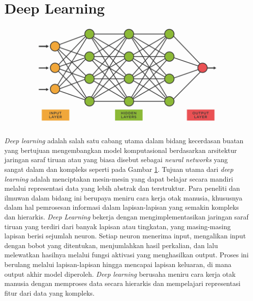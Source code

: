 \section{Deep Learning}
\begin{figure}[hbt!]
  \centering
	\includegraphics[width=0.9\linewidth]{gambar/bener/ArsitekturDeeplearning.png}
	\label{fig:Deep Learning secara umum}
\end{figure}  
\textit{Deep learning} adalah salah satu cabang utama dalam bidang kecerdasan buatan yang bertujuan mengembangkan model komputasional berdasarkan arsitektur jaringan saraf tiruan atau yang biasa disebut sebagai \textit{neural networks} yang sangat dalam dan kompleks seperti pada Gambar \ref{fig:Deep Learning secara umum}. Tujuan utama dari \textit{deep learning} adalah menciptakan mesin-mesin yang dapat belajar secara mandiri melalui representasi data yang lebih abstrak dan terstruktur. Para peneliti dan ilmuwan dalam bidang ini berupaya meniru cara kerja otak manusia, khususnya dalam hal pemrosesan informasi dalam lapisan-lapisan yang semakin kompleks dan hierarkis. \textit{Deep Learning} bekerja dengan mengimplementasikan jaringan saraf tiruan yang terdiri dari banyak lapisan atau tingkatan, yang masing-masing lapisan berisi sejumlah neuron. Setiap neuron menerima input, mengalikan input dengan bobot yang ditentukan, menjumlahkan hasil perkalian, dan lalu melewatkan hasilnya melalui fungsi aktivasi yang menghasilkan output. Proses ini berulang melalui lapisan-lapisan hingga mencapai lapisan keluaran, di mana output akhir model diperoleh. \textit{Deep learning} berusaha meniru cara kerja otak manusia dengan memproses data secara hierarkis dan mempelajari representasi fitur dari data yang kompleks. \cite{patterson2017deep}

